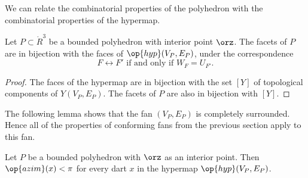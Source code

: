 We can relate the combinatorial properties of the polyhedron with the
combinatorial properties of the hypermap.

\begin{lemma}[]\label{lemma:facet-bi}
Let $P\subset\ring{R}^3$ be a bounded polyhedron with interior point
$\orz$.  The facets of $P$ are in bijection with the faces of
$\op{hyp}(V_P,E_P)$, under the correspondence
\begin{displaymath}
F\leftrightarrow F' \text{ if and only if } W_F = U_{F'}.
\end{displaymath}
\end{lemma}

\begin{proof} The faces of the hypermap are in bijection with the set
$[Y]$ of topological components of $Y(V_P,E_P)$.  The facets of $P$
are also in bijection with $[Y]$.
\end{proof}

The following lemma shows that the fan $(V_P,E_P)$ is completely
surrounded.  Hence all of the properties of conforming fans from the previous
section apply to this fan.

\begin{lemma}[] Let $P$ be a bounded polyhedron
with $\orz$ as an interior point.  Then $\op{azim}(x) < \pi$ for
every dart $x$ in the hypermap $\op{hyp}(V_P,E_P)$.
\end{lemma}
%
%
%
%

